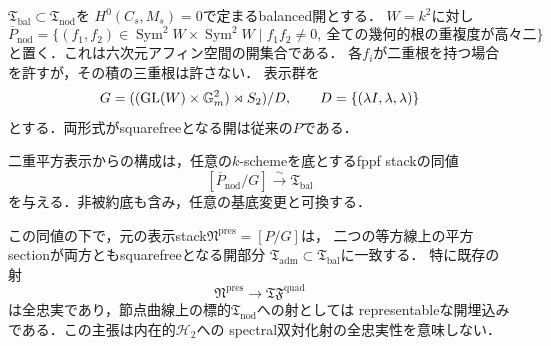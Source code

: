 $\mathfrak T_{\mathrm{bal}}\subset\mathfrak T_{\mathrm{nod}}$を
$H^0(C_s,M_s)=0$で定まるbalanced開とする．
$W=k^2$に対し
\[
 \overline P_{\mathrm{nod}}
 =\{(f_1,f_2)\in\operatorname{Sym}^2W\times\operatorname{Sym}^2W
       \mid f_1f_2\ne0,\ \text{全ての幾何的根の重複度が高々二}\}
\]
と置く．これは六次元アフィン空間の開集合である．
各$f_i$が二重根を持つ場合を許すが，その積の三重根は許さない．
表示群を
\[
 G=((\operatorname{GL}(W)\times\mathbb G_m^2)\rtimes S_2)/D,
 \qquad D=\{(\lambda I,\lambda,\lambda)\}
\]
とする．両形式がsquarefreeとなる開は従来の$P$である．

\begin{theorem}[balanced標的の群商表示と元のnoncubic開]
\label{thm:qa-tf-balanced-quotient-recognition}
二重平方表示からの構成は，任意の$k$-schemeを底とするfppf stackの同値
\[
 [\overline P_{\mathrm{nod}}/G]\xrightarrow{\sim}\mathfrak T_{\mathrm{bal}}
\]
を与える．非被約底も含み，任意の基底変更と可換する．

この同値の下で，元の表示stack$\mathfrak N^{\mathrm{pres}}=[P/G]$は，
二つの等方線上の平方sectionが両方ともsquarefreeとなる開部分
$\mathfrak T_{\mathrm{adm}}\subset\mathfrak T_{\mathrm{bal}}$に一致する．
特に既存の射
\[
 \mathfrak N^{\mathrm{pres}}\longrightarrow\mathfrak{TF}^{\mathrm{quad}}
\]
は全忠実であり，節点曲線上の標的$\mathfrak T_{\mathrm{nod}}$への射としては
representableな開埋込みである．この主張は内在的$\mathcal H_2$への
spectral双対化射の全忠実性を意味しない．
\end{theorem}

